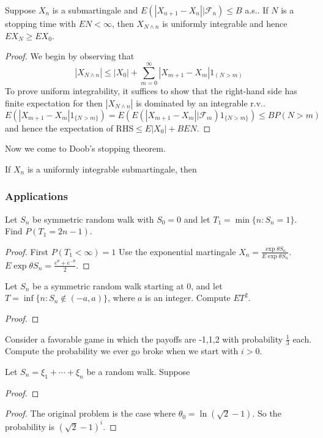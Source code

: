 \begin{theorem}
    Suppose $X_n$ is a submartingale and $E(|X_{n+1}-X_n||\mathcal{F}_n)\le B$ a.s..
    If $N$ is a stopping time with $EN<\infty$, then $X_{N\wedge n}$ is uniformly integrable
    and hence $EX_N\ge EX_0$.
\end{theorem}
\begin{proof}
    We begin by observing that \[|X_{N\wedge n}|\le |X_0|+\sum_{m=0}^\infty|X_{m+1}-X_m|1_{(N>m)}\] 
    To prove uniform integrability, it suffices to show that the right-hand side has finite expectation for then $|X_{N\wedge n}|$ is dominated by an integrable r.v..\newline 
    \[ E(|X_{m+1}-X_m|1_{\{N>m\}})=E(E(|X_{m+1}-X_m||\mathcal{F}_m)1_{\{N>m\}})\le BP(N>m)\] 
    and hence the expectation of RHS$\le E|X_0|+BEN$.
\end{proof}

Now we come to Doob's stopping theorem.
\begin{theorem}
    If $X_n$ is a uniformly integrable submartingale, then 
\end{theorem}


\subsubsection{Applications}
\begin{example}
    
\end{example}

\begin{example}
    Let $S_n$ be symmetric random walk with $S_0=0$ and let $T_1=\min\{n:S_n=1\}$.
    Find $P(T_1=2n-1)$.
\end{example}
\begin{proof}
    First $P(T_1<\infty)=1$
    Use the exponential martingale $X_n=\frac{\exp{\theta S_n}}{E\exp{\theta S_n}}$. $E\exp{\theta S_n}=\frac{e^\theta+e^{-\theta}}{2}$.
\end{proof}

\begin{example}
    Let $S_n$ be a symmetric random walk starting at $0$, and let $T=\inf\{n:S_n\notin (-a,a)\}$,
    where $a$ is an integer. Compute $ET^2$.
\end{example}
\begin{proof}
    
\end{proof}

\begin{example}
    Consider a favorable game in which the payoffs are -1,1,2 with probability $\frac{1}{3}$ each. Compute the probability 
    we ever go broke when we start with $i>0$.
\end{example}
\begin{lemma}
    Let $S_n=\xi_1+\cdots+\xi_n$ be a random walk. Suppose  
\end{lemma}
\begin{proof}
    
\end{proof}
\begin{proof}
    The original problem is the case where $\theta_0=\ln (\sqrt{2}-1)$. So the probability is $(\sqrt{2}-1)^i$.
\end{proof}
